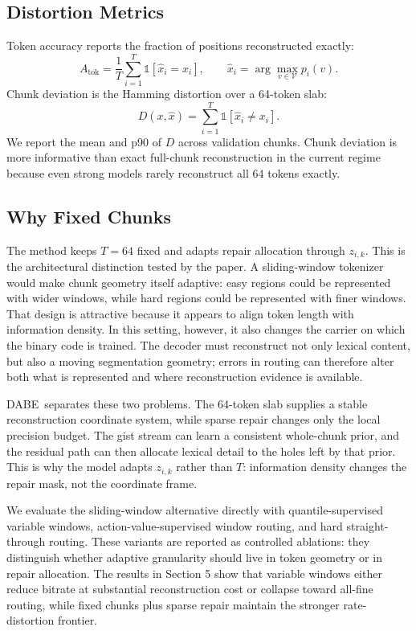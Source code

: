 \documentclass[11pt]{article}
\newcommand{\dabe}{\textsc{DABE}}
\newcommand{\Vocab}{\mathcal{V}}
\newcommand{\indicator}{\mathbb{1}}
\begin{document}
\subsection{Distortion Metrics}
Token accuracy reports the fraction of positions reconstructed exactly:
\begin{equation}
  A_{\mathrm{tok}}
  = \frac{1}{T} \sum_{i=1}^{T} \indicator[\hat{x}_i = x_i],
  \qquad
  \hat{x}_i = \arg\max_{v \in \Vocab} p_i(v).
\end{equation}
Chunk deviation is the Hamming distortion over a 64-token slab:
\begin{equation}
  D(x, \hat{x}) = \sum_{i=1}^{T} \indicator[\hat{x}_i \neq x_i].
  \label{eq:chunk-deviation}
\end{equation}
We report the mean and p90 of $D$ across validation chunks. Chunk deviation is more informative than exact full-chunk reconstruction in the current regime because even strong models rarely reconstruct all 64 tokens exactly.

\subsection{Why Fixed Chunks}
The method keeps $T=64$ fixed and adapts repair allocation through $z_{i,k}$. This is the architectural distinction tested by the paper. A sliding-window tokenizer would make chunk geometry itself adaptive: easy regions could be represented with wider windows, while hard regions could be represented with finer windows. That design is attractive because it appears to align token length with information density. In this setting, however, it also changes the carrier on which the binary code is trained. The decoder must reconstruct not only lexical content, but also a moving segmentation geometry; errors in routing can therefore alter both what is represented and where reconstruction evidence is available.

\dabe\ separates these two problems. The 64-token slab supplies a stable reconstruction coordinate system, while sparse repair changes only the local precision budget. The gist stream can learn a consistent whole-chunk prior, and the residual path can then allocate lexical detail to the holes left by that prior. This is why the model adapts $z_{i,k}$ rather than $T$: information density changes the repair mask, not the coordinate frame.

We evaluate the sliding-window alternative directly with quantile-supervised variable windows, action-value-supervised window routing, and hard straight-through routing. These variants are reported as controlled ablations: they distinguish whether adaptive granularity should live in token geometry or in repair allocation. The results in Section 5 show that variable windows either reduce bitrate at substantial reconstruction cost or collapse toward all-fine routing, while fixed chunks plus sparse repair maintain the stronger rate-distortion frontier.
\end{document}
